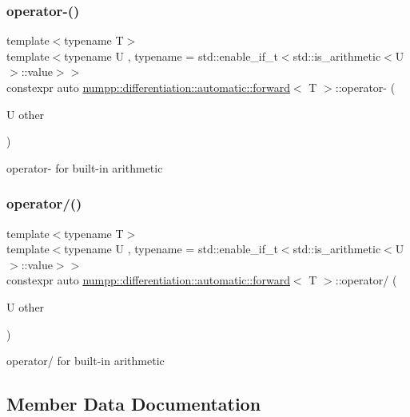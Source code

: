 \subsubsection{\texorpdfstring{operator-\/()}{operator-()}}
{\footnotesize\ttfamily template$<$typename T$>$ \\
template$<$typename U , typename  = std\+::enable\+\_\+if\+\_\+t$<$std\+::is\+\_\+arithmetic$<$\+U$>$\+::value$>$$>$ \\
constexpr auto \hyperlink{classnumpp_1_1differentiation_1_1automatic_1_1forward}{numpp\+::differentiation\+::automatic\+::forward}$<$ T $>$\+::operator-\/ (\begin{DoxyParamCaption}\item[{U}]{other }\end{DoxyParamCaption})\hspace{0.3cm}{\ttfamily [inline]}}

operator-\/ for built-\/in arithmetic\mbox{\label{classnumpp_1_1differentiation_1_1automatic_1_1forward_a630cf420f7160392da3f4c575b2d8e66}} 
\subsubsection{\texorpdfstring{operator/()}{operator/()}}
{\footnotesize\ttfamily template$<$typename T$>$ \\
template$<$typename U , typename  = std\+::enable\+\_\+if\+\_\+t$<$std\+::is\+\_\+arithmetic$<$\+U$>$\+::value$>$$>$ \\
constexpr auto \hyperlink{classnumpp_1_1differentiation_1_1automatic_1_1forward}{numpp\+::differentiation\+::automatic\+::forward}$<$ T $>$\+::operator/ (\begin{DoxyParamCaption}\item[{U}]{other }\end{DoxyParamCaption})\hspace{0.3cm}{\ttfamily [inline]}}

operator/ for built-\/in arithmetic

\subsection{Member Data Documentation}
\mbox{\label{classnumpp_1_1differentiation_1_1automatic_1_1forward_abcaca75164fca6c9d423d6b11b5517e9}} 
